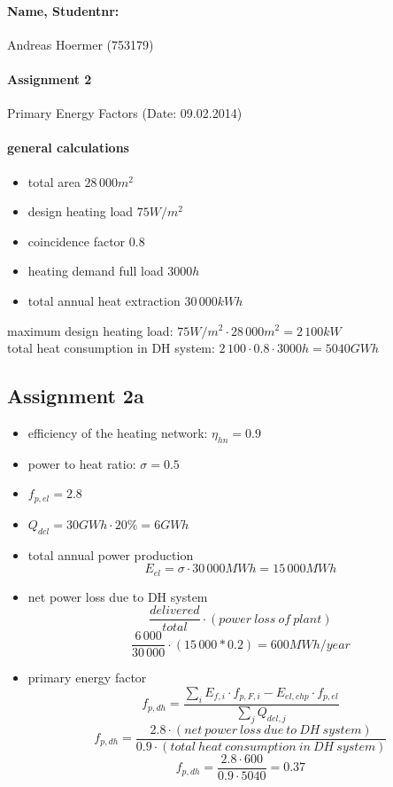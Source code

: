 \documentclass{article}
\begin{document}
	\paragraph{Name, Studentnr: }Andreas Hoermer (753179)
	\paragraph{Assignment 2}Primary Energy Factors (Date: 09.02.2014)
	\paragraph{general calculations}
		\begin{itemize}
			\item total area $28\,000m^2$
			\item design heating load $75W/m^2$
			\item coincidence factor $0.8$
			\item heating demand full load $3000h$
			\item total annual heat extraction $30\,000kWh$
		\end{itemize}
		maximum design heating load: $75W/m^2\cdot 28\,000m^2 = 2\,100kW$\\
		total heat consumption in DH system: $2\,100\cdot 0.8\cdot 3000h = 5040GWh$\\

	\subsection*{Assignment 2a}
		\begin{itemize}
			\item efficiency of the heating network: $\eta_{hn}=0.9$
			\item power to heat ratio: $\sigma=0.5$
			\item $f_{p,el}=2.8$
			\item $Q_{del}=30GWh\cdot 20\%=6GWh$
			\item total annual power production\\
				$$E_{el}=\sigma \cdot 30\,000MWh = 15\,000MWh$$
			\item net power loss due to DH system\\
				$$\frac{delivered}{total}\cdot (power\ loss\ of\ plant)$$
				$$\frac{6\,000}{30\,000}\cdot (15\,000*0.2) = 600MWh/year$$
			\item primary energy factor\\
				$$f_{p,dh}=\frac{\sum_i E_{f,i}\cdot f_{p,F,i}-E_{el,chp}\cdot f_{p,el}}{\sum_j Q_{del,j}}$$
				$$f_{p,dh}=\frac{2.8\cdot (net\ power\ loss\ due\ to\ DH\ system)}{0.9\cdot (total\ heat\ consumption\ in\ DH\ system)}$$
				$$f_{p,dh}=\frac{2.8\cdot 600}{0.9\cdot 5040} = 0.37$$
		\end{itemize}
\end{document}
